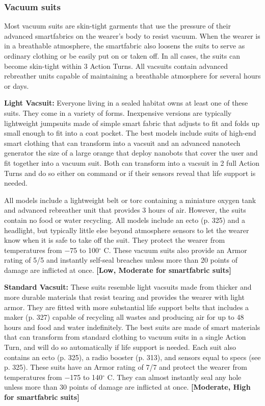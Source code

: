 \subsubsection{Vacuum suits}

Most vacuum suits are skin-tight garments that use the pressure of their advanced smartfabrics on the wearer’s body to resist vacuum. When the wearer is in a breathable atmosphere, the smartfabric also loosens the suits to serve as ordinary clothing or be easily put on or taken off. In all cases, the suits can become skin-tight within 3 Action Turns. All vacsuits contain advanced rebreather units capable of maintaining a breathable atmosphere for several hours or days.

\textbf{Light Vacsuit:} Everyone living in a sealed habitat owns at least one of these suits. They come in a variety of forms. Inexpensive versions are typically lightweight jumpsuits made of simple smart fabric that adjusts to fit and folds up small enough to fit into a coat pocket. The best models include suits of high-end smart clothing that can transform into a vacsuit and an advanced nanotech generator the size of a large orange that deploy nanobots that cover the user and fit together into a vacuum suit. Both can transform into a vacsuit in 2 full Action Turns and do so either on command or if their sensors reveal that life support is needed.

All models include a lightweight belt or torc containing a miniature oxygen tank and advanced rebreather unit that provides 3 hours of air. However, the suits contain no food or water recycling. All models include an ecto (p. 325) and a headlight, but typically little else beyond atmosphere sensors to let the wearer know when it is safe to take off the suit. They protect the wearer from temperatures from $-$75 to 100$^{\circ}$ C. These vacuum suits also provide an Armor rating of 5/5 and instantly self-seal breaches unless more than 20 points of damage are inflicted at once. \textbf{[Low, Moderate for smartfabric suits]}

\textbf{Standard Vacsuit:} These suits resemble light vacsuits made from thicker and more durable materials that resist tearing and provides the wearer with light armor. They are fitted with more substantial life support belts that includes a maker (p. 327) capable of recycling all wastes and producing air for up to 48 hours and food and water indefinitely. The best suits are made of smart materials that can transform from standard clothing to vacuum suits in a single Action Turn, and will do so automatically if life support is needed. Each suit also contains an ecto (p. 325), a radio booster (p. 313), and sensors equal to specs (see p. 325). These suits have an Armor rating of 7/7 and protect the wearer from temperatures from $-$175 to 140$^{\circ}$ C. They can almost instantly seal any hole unless more than 30 points of damage are inflicted at once. \textbf{[Moderate, High for smartfabric suits]}

